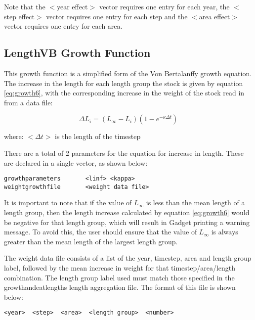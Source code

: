 \documentclass[]{book}
\begin{document}
Note that the \(<\)year effect\(>\) vector requires one entry for each year,
the \(<\)step effect\(>\) vector requires one entry for each step and the
\(<\)area effect\(>\) vector requires one entry for each area.

\hypertarget{subsec:growth6}{%
\subsection{LengthVB Growth Function}\label{subsec:growth6}}

This growth function is a simplified form of the Von Bertalanffy growth
equation. The increase in the length for each length group the stock is
given by equation \eqref{eq:growth6}, with the corresponding increase in the weight
of the stock read in from a data file:

\begin{equation}
\label{eq:growth6}
\Delta L_{i} = \left( L_{\infty} - L_{i} \right) \left( 1 - e^{-\kappa \Delta t} \right)\end{equation}

where: \(<\Delta t>\) is the length of the timestep

There are a total of 2 parameters for the equation for increase in
length. These are declared in a single vector, as shown below:

\begin{verbatim}
growthparameters       <linf> <kappa>
weightgrowthfile       <weight data file>
\end{verbatim}

It is important to note that if the value of \(L_{\infty}\) is less than
the mean length of a length group, then the length increase calculated
by equation \eqref{eq:growth6} would be negative for that length group, which
will result in Gadget printing a warning message. To avoid this, the
user should ensure that the value of \(L_{\infty}\) is always greater than
the mean length of the largest length group.

The weight data file consists of a list of the year, timestep, area and
length group label, followed by the mean increase in weight for that
timestep/area/length combination. The length group label used must match
those specified in the growthandeatlengths length aggregation file. The
format of this file is shown below:

\begin{verbatim}
<year>  <step>  <area>  <length group>  <number>
\end{verbatim}
\end{document}
